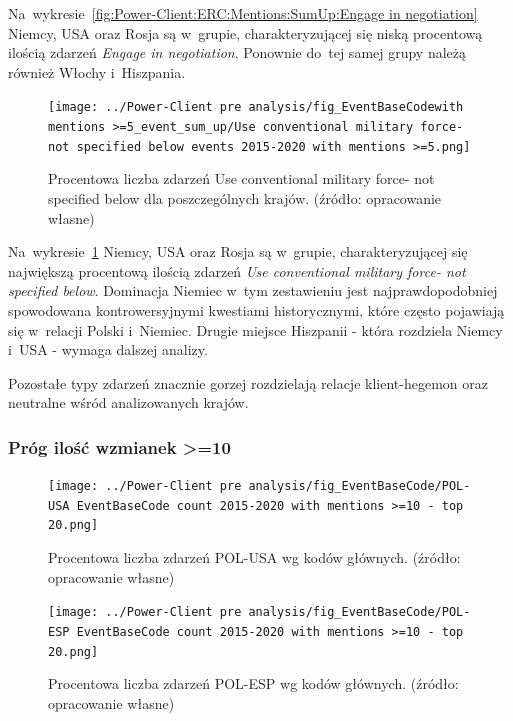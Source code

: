 \documentclass[11pt]{report}
\begin{document}
    Na~wykresie~\ref{fig:Power-Client:ERC:Mentions:SumUp:Engage in negotiation} Niemcy, USA oraz Rosja są w~grupie,
    charakteryzującej się niską procentową ilością zdarzeń \textit{Engage in negotiation}.
    Ponownie do~tej samej grupy należą również Włochy i~Hiszpania.

    \begin{figure}[tp]
        \centering
        \texttt{[image: ../Power-Client pre analysis/fig\_EventBaseCodewith mentions >=5\_event\_sum\_up/Use conventional military force- not specified below events 2015-2020 with mentions >=5.png]}
        \caption{Procentowa liczba zdarzeń Use conventional military force- not specified below dla poszczególnych krajów. (źródło: opracowanie własne)}
        \label{fig:Power-Client:ERC:Goldstein:SumUp:Use conventional military force- not specified below}
    \end{figure}

    Na~wykresie~\ref{fig:Power-Client:ERC:Goldstein:SumUp:Use conventional military force- not specified below} Niemcy, USA oraz Rosja są w~grupie,
    charakteryzującej się największą procentową ilością zdarzeń \textit{Use conventional military force- not specified below}.
    Dominacja Niemiec w~tym zestawieniu jest najprawdopodobniej spowodowana kontrowersyjnymi kwestiami historycznymi,
    które często pojawiają się w~relacji Polski i~Niemiec.
    Drugie miejsce Hiszpanii - która rozdziela Niemcy i~USA - wymaga dalszej analizy.

    Pozostałe typy zdarzeń znacznie gorzej rozdzielają relacje klient-hegemon oraz neutralne wśród analizowanych krajów.

    \subsubsection{Próg ilość wzmianek >=10}

    \begin{figure}[tp]
        \centering
        \texttt{[image: ../Power-Client pre analysis/fig\_EventBaseCode/POL-USA EventBaseCode count 2015-2020 with mentions >=10 - top 20.png]}
        \caption{Procentowa liczba zdarzeń POL-USA wg kodów głównych. (źródło: opracowanie własne)}
        \label{fig:Power-Client:EBC:Mentions10:POL-USA}
    \end{figure}

    \begin{figure}[tp]
        \centering
        \texttt{[image: ../Power-Client pre analysis/fig\_EventBaseCode/POL-ESP EventBaseCode count 2015-2020 with mentions >=10 - top 20.png]}
        \caption{Procentowa liczba zdarzeń POL-ESP wg kodów głównych. (źródło: opracowanie własne)}
        \label{fig:Power-Client:EBC:Mentions10:POL-ESP}
    \end{figure}
\end{document}

